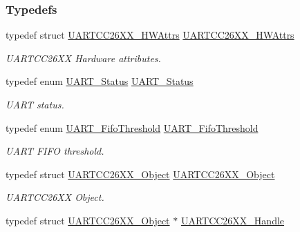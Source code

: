 \subsubsection*{Typedefs}
\begin{DoxyCompactItemize}
\item 
typedef struct \hyperlink{struct_u_a_r_t_c_c26_x_x___h_w_attrs}{U\+A\+R\+T\+C\+C26\+X\+X\+\_\+\+H\+W\+Attrs} \hyperlink{_u_a_r_t_c_c26_x_x_8h_a779ad8f4640de879a0cdf41f4274206d}{U\+A\+R\+T\+C\+C26\+X\+X\+\_\+\+H\+W\+Attrs}
\begin{DoxyCompactList}\small\item\em U\+A\+R\+T\+C\+C26\+X\+X Hardware attributes. \end{DoxyCompactList}\item 
typedef enum \hyperlink{_u_a_r_t_c_c26_x_x_8h_a778bbef5f4b52a5651552136715f53c4}{U\+A\+R\+T\+\_\+\+Status} \hyperlink{_u_a_r_t_c_c26_x_x_8h_a27818b82da9cf35d1f0f228b1f69b036}{U\+A\+R\+T\+\_\+\+Status}
\begin{DoxyCompactList}\small\item\em U\+A\+R\+T status. \end{DoxyCompactList}\item 
typedef enum \hyperlink{_u_a_r_t_c_c26_x_x_8h_a292a5e751577698b215f5e8aa1c79e99}{U\+A\+R\+T\+\_\+\+Fifo\+Threshold} \hyperlink{_u_a_r_t_c_c26_x_x_8h_a9169576296a1811855ec75dce0f8e316}{U\+A\+R\+T\+\_\+\+Fifo\+Threshold}
\begin{DoxyCompactList}\small\item\em U\+A\+R\+T F\+I\+F\+O threshold. \end{DoxyCompactList}\item 
typedef struct \hyperlink{struct_u_a_r_t_c_c26_x_x___object}{U\+A\+R\+T\+C\+C26\+X\+X\+\_\+\+Object} \hyperlink{_u_a_r_t_c_c26_x_x_8h_a41437180bc6a286da889dc2aae1c001c}{U\+A\+R\+T\+C\+C26\+X\+X\+\_\+\+Object}
\begin{DoxyCompactList}\small\item\em U\+A\+R\+T\+C\+C26\+X\+X Object. \end{DoxyCompactList}\item 
typedef struct \hyperlink{struct_u_a_r_t_c_c26_x_x___object}{U\+A\+R\+T\+C\+C26\+X\+X\+\_\+\+Object} $\ast$ \hyperlink{_u_a_r_t_c_c26_x_x_8h_a276d493f1689ad8c16b5cfb4dada194a}{U\+A\+R\+T\+C\+C26\+X\+X\+\_\+\+Handle}
\end{DoxyCompactItemize}
